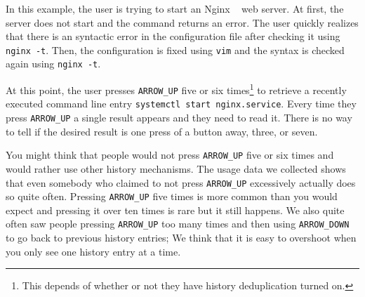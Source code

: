 \documentclass[thesis=M,english]{FITthesis}[2012/10/20]
\newcommand{\redtext}[1]{\textcolor{red}{[[#1]]}}
\let\myCite\cite
\renewcommand\cite{\unskip~\myCite}
\begin{document}
In this example, the user is trying to start an Nginx \cite{reese2008nginx} web server. At first, the server does not start and the command returns an error. The user quickly realizes that there is an syntactic error in the configuration file after checking it using \verb|nginx -t|. Then, the configuration is fixed using \verb|vim| and the syntax is checked again using \verb|nginx -t|. 

At this point, the user presses \verb|ARROW_UP| five or six times\footnote{This depends of whether or not they have history deduplication turned on.} to retrieve a recently executed command line entry \verb|systemctl start nginx.service|. Every time they press \verb|ARROW_UP| a single result appears and they need to read it. There is no way to tell if the desired result is one press of a button away, three, or seven. %



You might think that people would not press \verb|ARROW_UP| five or six times and would rather use other history mechanisms.
The usage data we collected shows that even somebody who claimed to not press \verb|ARROW_UP| excessively actually does so quite often. Pressing \verb|ARROW_UP| five times is more common than you would expect and pressing it over ten times is rare but it still happens. We also quite often saw people pressing \verb|ARROW_UP| too many times and then using \verb|ARROW_DOWN| to go back to previous history entries; We think that it is easy to overshoot when you only see one history entry at a time.



\end{document}
